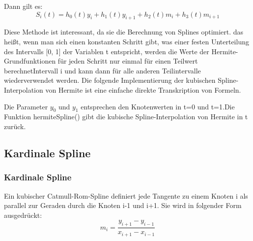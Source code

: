{		
		\begin{frame}
			Dann gilt es: 
			\[S_i(t)=h_0(t)y_i+h_1(t)y_{i+1}+h_2(t)m_i+h_3(t)m_{i+1}\]
		\end{frame}
		
		Diese Methode ist interessant, da sie die Berechnung von Splines optimiert. das heißt, wenn man sich einen konstanten Schritt gibt, was einer festen Unterteilung des Intervalls [0, 1] der Variablen t entspricht, werden die Werte der Hermite-Grundfunktionen für jeden Schritt nur einmal für einen Teilwert berechnetIntervall i und kann dann für alle anderen Teilintervalle wiederverwendet werden.
		Die folgende Implementierung der kubischen Spline-Interpolation von Hermite ist eine einfache direkte Transkription von Formeln.
		
		
		
		
		
		Die Parameter \(y_0\) und \(y_1\) entsprechen den Knotenwerten in t=0 und t=1.Die Funktion hermiteSpline() gibt die kubische Spline-Interpolation von Hermite in t zurück.
		
		
		
		
		\subsection{Kardinale Spline}
		\begin{frame}
			\frametitle{Kardinale Spline}
			Ein kubischer Catmull-Rom-Spline definiert jede Tangente zu einem Knoten i als parallel zur Geraden durch die Knoten i-1 und i+1.\cite{cardinal} Sie wird in folgender Form ausgedrückt:
			\[m_i=\frac{y_{i+1}-y_{i-1}}{x_{i+1}-x_{i-1}}\]
			\begin{figure}[htb]
				\centering
				
			\end{figure}
			

\end{frame}}
